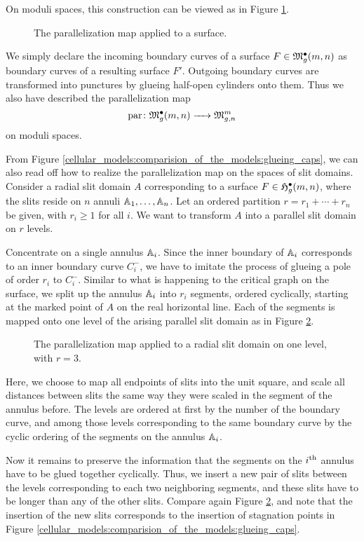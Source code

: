 On moduli spaces, this construction can be viewed as in Figure \ref{cellular_parallelization_on_modspc}.
\begin{figure}[ht]
\centering
\def\svgwidth{0.8\columnwidth}

\caption{\label{cellular_parallelization_on_modspc} The parallelization map applied to a surface.}
\end{figure}
We simply declare the incoming boundary curves of a surface $F \in \mathfrak{M}^\bullet_g(m, n)$ as boundary curves of a resulting surface $F'$.
Outgoing boundary curves are transformed into punctures by glueing half-open cylinders onto them.
Thus we also have described the parallelization map 
\[
  \operatorname{par} \colon \mathfrak{M}^\bullet_g(m, n) \xrightarrow{\hspace{6pt}{}\hspace{6pt}} \mathfrak{M}^m_{g,n}
\]
on moduli spaces.

From Figure \ref{cellular_models:comparision_of_the_models:glueing_caps}, we can also read off how to realize the parallelization map on the spaces of slit domains.
Consider a radial slit domain $A$ corresponding to a surface $F \in \mathfrak{H}^{\bullet}_g(m, n)$,
where the slits reside on $n$ annuli $\mathbb A_1, \dotsc, \mathbb A_n$.
Let an ordered partition $r = r_1 + \dotsb + r_n$ be given, with $r_i \geq 1$ for all $i$. 
We want to transform $A$ into a parallel slit domain on $r$ levels.

Concentrate on a single annulus $\mathbb A_i$.
Since the inner boundary of $\mathbb A_i$ corresponds to an inner boundary curve $C^-_i$, 
we have to imitate the process of glueing a pole of order $r_i$ to $C^-_i$.
Similar to what is happening to the critical graph on the surface, we split up the annulus $\mathbb A_i$ into $r_i$ segments,
ordered cyclically, starting at the marked point of $A$ on the real horizontal line.
Each of the segments is mapped onto one level of the arising parallel slit domain as in Figure \ref{cellular_parallelization_on_complexes}.
\begin{figure}[ht]
\centering
{}
\caption{\label{cellular_parallelization_on_complexes} The parallelization map applied to a radial slit domain on one level, with $r = 3$.}
\end{figure}
Here, we choose to map all endpoints of slits into the unit square, and scale all distances between slits the same way they were scaled in the segment of the annulus before.
The levels are ordered at first by the number of the boundary curve, 
and among those levels corresponding to the same boundary curve by the cyclic ordering of the segments on the annulus $\mathbb A_i$.

Now it remains to preserve the information that the segments on the $i^{\text{th}}$ annulus have to be glued together cyclically.
Thus, we insert a new pair of slits between the levels corresponding to each two neighboring segments,
and these slits have to be longer than any of the other slits.
Compare again Figure \ref{cellular_parallelization_on_complexes},
and note that the insertion of the new slits corresponds to the insertion of stagnation points in Figure \ref{cellular_models:comparision_of_the_models:glueing_caps}.

